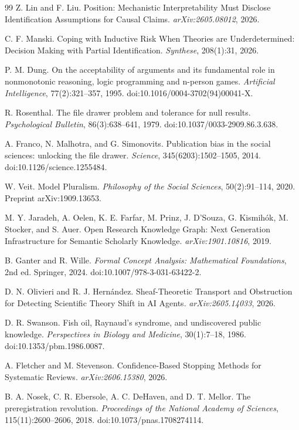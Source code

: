 \begin{thebibliography}{99}
Z. Lin and F. Liu. Position: Mechanistic Interpretability Must Disclose Identification Assumptions for Causal Claims. \emph{arXiv:2605.08012}, 2026.

C. F. Manski. Coping with Inductive Risk When Theories are Underdetermined: Decision Making with Partial Identification. \emph{Synthese}, 208(1):31, 2026.

P. M. Dung. On the acceptability of arguments and its fundamental role in nonmonotonic reasoning, logic programming and n-person games. \emph{Artificial Intelligence}, 77(2):321--357, 1995. doi:10.1016/0004-3702(94)00041-X.

R. Rosenthal. The file drawer problem and tolerance for null results. \emph{Psychological Bulletin}, 86(3):638--641, 1979. doi:10.1037/0033-2909.86.3.638.

A. Franco, N. Malhotra, and G. Simonovits. Publication bias in the social sciences: unlocking the file drawer. \emph{Science}, 345(6203):1502--1505, 2014. doi:10.1126/science.1255484.

W. Veit. Model Pluralism. \emph{Philosophy of the Social Sciences}, 50(2):91--114, 2020. Preprint arXiv:1909.13653.

M. Y. Jaradeh, A. Oelen, K. E. Farfar, M. Prinz, J. D'Souza, G. Kismih\'ok, M. Stocker, and S. Auer. Open Research Knowledge Graph: Next Generation Infrastructure for Semantic Scholarly Knowledge. \emph{arXiv:1901.10816}, 2019.

B. Ganter and R. Wille. \emph{Formal Concept Analysis: Mathematical Foundations}, 2nd ed. Springer, 2024. doi:10.1007/978-3-031-63422-2.

D. N. Olivieri and R. J. Hern\'andez. Sheaf-Theoretic Transport and Obstruction for Detecting Scientific Theory Shift in AI Agents. \emph{arXiv:2605.14033}, 2026.

D. R. Swanson. Fish oil, Raynaud's syndrome, and undiscovered public knowledge. \emph{Perspectives in Biology and Medicine}, 30(1):7--18, 1986. doi:10.1353/pbm.1986.0087.

A. Fletcher and M. Stevenson. Confidence-Based Stopping Methods for Systematic Reviews. \emph{arXiv:2606.15380}, 2026.

B. A. Nosek, C. R. Ebersole, A. C. DeHaven, and D. T. Mellor. The preregistration revolution. \emph{Proceedings of the National Academy of Sciences}, 115(11):2600--2606, 2018. doi:10.1073/pnas.1708274114.


\end{thebibliography}
